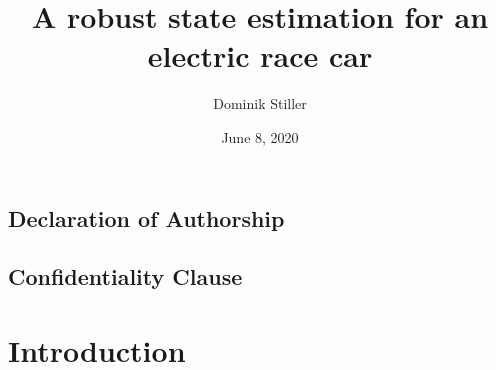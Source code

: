 \title{A robust state estimation for an electric race car}
\author{Dominik Stiller}
\date{June 8, 2020}



\makeglossaries




	\pagestyle{empty}
	\makeatletter
	\begin{titlepage}
		
	\end{titlepage}
	
	\section*{Declaration of Authorship}
	
	\makeatother
	\vfill
	
	\section*{Confidentiality Clause}
	
	\vfill

	\begin{abstract}
		
	\end{abstract}

	\setlength{\cftbeforetoctitleskip}{2.1em}
	\begin{spacing}{1.15}
	   \tableofcontents
	\end{spacing}
	\clearpage
	\thispagestyle{empty}
	
	\pagestyle{plain}
	
	\printacronyms
	\clearpage
	
	\listoffigures
	\clearpage
	\listoftables
	\clearpage
	
	\printnomenclature
	\clearpage
	
	
	\pagestyle{headings}
	
	\chapter{Introduction}
	
